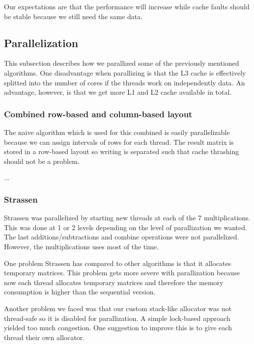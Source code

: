 Our expectations are that the performance will increase while cache faults should be stable because we still need the same data. 

\subsection{Parallelization}

This subsection describes how we parallized some of the previously mentioned algorithms. One disadvantage when parallizing is that the L3 cache is effectively splitted into the number of cores if the threads work on independently data. An advantage, however, is that we get more L1 and L2 cache available in total.


\subsubsection{Combined row-based and column-based layout}

The naive algorithm which is used for this combined is easily parallelizable because we can assign intervals of rows for each thread. The result matrix is stored in a row-based layout so writing is separated such that cache thrashing should not be a problem.

...


\subsubsection{Strassen}

Strassen was parallelized by starting new threads at each of the 7 multiplications. This was done at 1 or 2 levels depending on the level of parallization we wanted. The last additions/subtractions and combine operations were not parallelized. However, the multiplications uses most of the time.

One problem Strassen has compared to other algorithms is that it allocates temporary matrices. This problem gets more severe with parallization because now each thread allocates temporary matrices and therefore the memory consumption is higher than the sequential version.

Another problem we faced was that our custom stack-like allocator was not thread-safe so it is disabled for parallization. A simple lock-based approach yielded too much congestion. One suggestion to improve this is to give each thread their own allocator.

